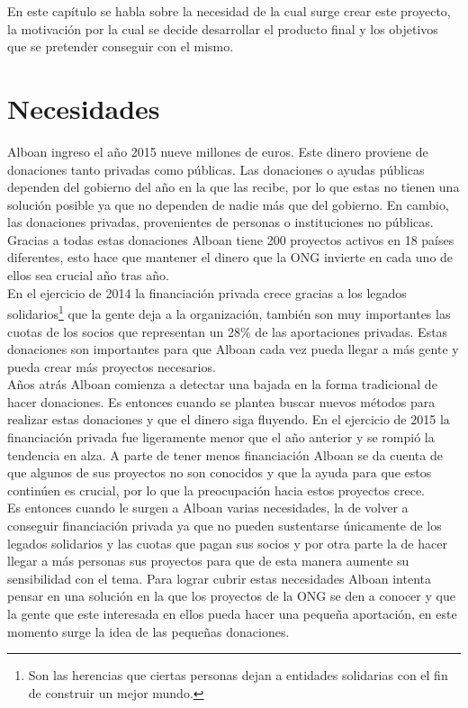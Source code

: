 \small %
En este capítulo se habla sobre la necesidad de la cual surge crear este proyecto, la motivación por la cual se decide desarrollar el producto final y los objetivos que se pretender conseguir con el mismo.

\section{Necesidades}

Alboan ingreso el año 2015 nueve millones de euros. Este dinero proviene de donaciones tanto privadas como públicas. Las donaciones o ayudas públicas dependen del gobierno del año en la que las recibe, por lo que estas no tienen una solución posible ya que no dependen de nadie más que del gobierno. En cambio, las donaciones privadas, provenientes de personas o instituciones no públicas. Gracias a todas estas donaciones Alboan tiene 200 proyectos activos en 18 países diferentes, esto hace que mantener el dinero que la ONG invierte en cada uno de ellos sea crucial año tras año. \\

En el ejercicio de 2014 la financiación privada crece gracias a los legados solidarios\footnote{Son las herencias que ciertas personas dejan a entidades solidarias con el fin de construir un mejor mundo.} que la gente deja a la organización, también son muy importantes las cuotas de los socios que representan un 28\% de las aportaciones privadas. Estas donaciones son importantes para que Alboan cada vez pueda llegar a más gente y pueda crear más proyectos necesarios.\\

Años atrás Alboan comienza a detectar una bajada en la forma tradicional de hacer donaciones. Es entonces cuando se plantea buscar nuevos métodos para realizar estas donaciones y que el dinero siga fluyendo. En el ejercicio de 2015 la financiación privada fue ligeramente menor que el año anterior y se rompió la tendencia en alza. A parte de tener menos financiación Alboan se da cuenta de que algunos de sus proyectos no son conocidos y que la ayuda para que estos continúen es crucial, por lo que la preocupación hacia estos proyectos crece.\\

Es entonces cuando le surgen a Alboan varias necesidades, la de volver a conseguir financiación privada ya que no pueden sustentarse únicamente de los legados solidarios y las cuotas que pagan sus socios y por otra parte la de hacer llegar a más personas sus proyectos para que de esta manera aumente su sensibilidad con el tema. Para lograr cubrir estas necesidades Alboan intenta pensar en una solución en la que los proyectos de la ONG se den a conocer y que la gente que este interesada en ellos pueda hacer una pequeña aportación, en este momento surge la idea de las pequeñas donaciones.\\


